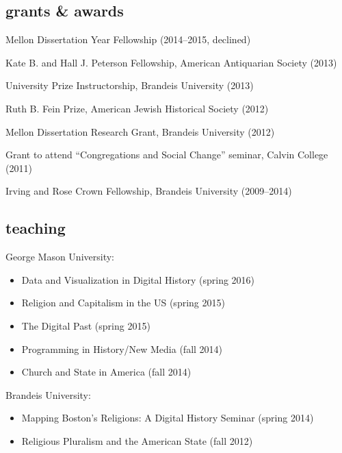 \documentclass[11pt]{article}
\providecommand{\tightlist}{%
  \setlength{\itemsep}{0pt}\setlength{\parskip}{0pt}}
\begin{document}
\subsection{grants \& awards}\label{grants-awards}

Mellon Dissertation Year Fellowship (2014--2015, declined)

Kate B. and Hall J. Peterson Fellowship, American Antiquarian Society
(2013)

University Prize Instructorship, Brandeis University (2013)

Ruth B. Fein Prize, American Jewish Historical Society (2012)

Mellon Dissertation Research Grant, Brandeis University (2012)

Grant to attend ``Congregations and Social Change'' seminar, Calvin
College (2011)

Irving and Rose Crown Fellowship, Brandeis University (2009--2014)

\subsection{teaching}\label{teaching}

George Mason University:

\vspace{-0.2in}

\begin{itemize}
    \tightlist
  \item Data and Visualization in Digital History (spring 2016)
  \item Religion and Capitalism in the US (spring 2015) 
  \item The Digital Past (spring 2015)
  \item Programming in History/New Media (fall 2014) 
  \item Church and State in America (fall 2014)
\end{itemize}

\vspace{-0.1in}

Brandeis University:

\vspace{-0.2in}

\begin{itemize}
    \tightlist
  \item
    Mapping Boston's Religions: A Digital History Seminar (spring 2014)
  \item
    Religious Pluralism and the American State (fall 2012)
\end{itemize}
\end{document}
